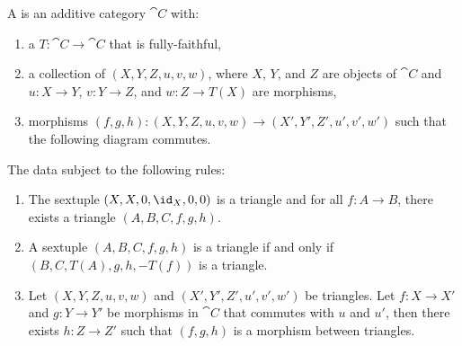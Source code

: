 \begin{definition}
    A  is an additive category $\cat{C}$ with:
    \begin{enumerate}
        \item a  $T:\cat{C}\to\cat{C}$ that is fully-faithful,
        \item a collection of  $(X,Y,Z,u,v,w)$, where $X$, $Y$, and $Z$ are objects of $\cat{C}$ and $u:X\to Y$, $v:Y\to Z$, and $w:Z\to T(X)$ are morphisms,
        \item morphisms $(f,g,h):(X,Y,Z,u,v,w)\to(X',Y',Z',u',v',w')$ such that the following diagram commutes.
    \end{enumerate}
    \begin{center}
    \end{center}
    The data subject to the following rules:
    \begin{enumerate}
        \item The sextuple $(X,X,0,{\id}_{X},0,0)$ is a triangle and for all $f:A\to B$, there exists a triangle $(A,B,C,f,g,h)$.
        \item A sextuple $(A,B,C,f,g,h)$ is a triangle if and only if $(B,C,T(A),g,h,-T(f))$ is a triangle.
        \item Let $(X,Y,Z,u,v,w)$ and $(X',Y',Z',u',v',w')$ be triangles. Let $f:X\to X'$ and $g:Y\to Y'$ be morphisms in $\cat{C}$ that commutes with $u$ and $u'$, then there exists $h:Z\to Z'$ such that $(f,g,h)$ is a morphism between triangles.
        \begin{center}
\end{center}
\end{enumerate}
\end{definition}
